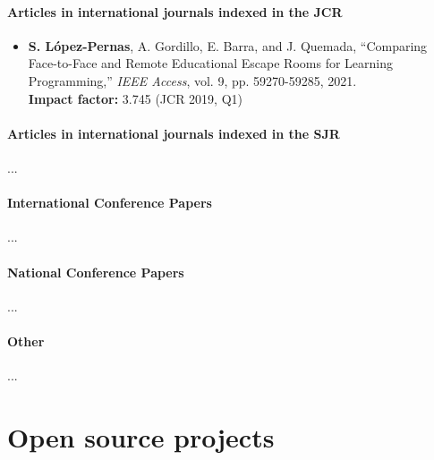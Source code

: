 \paragraph{Articles in international journals indexed in the JCR}

\begin{itemize}
   \small
  \item \textbf{S. López-Pernas}, A. Gordillo, E. Barra, and J. Quemada, ``Comparing Face-to-Face and Remote Educational Escape Rooms for Learning Programming,'' \textit{IEEE Access}, vol. 9, pp. 59270-59285, 2021. \\ \textbf{Impact factor:} 3.745 (JCR 2019, Q1)
\end{itemize}

\newpage
\paragraph{Articles in international journals indexed in the SJR}

...
\paragraph{International Conference Papers}

...

\paragraph{National Conference Papers}

...

\paragraph{Other}

...




\section{Open source projects}
\label{ch07:os}
